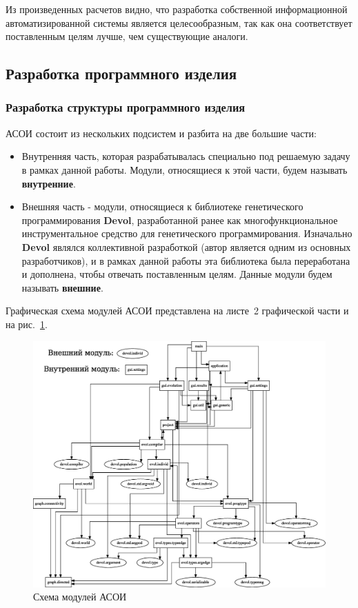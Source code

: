 \documentclass[russian,utf8,emptystyle]{eskdtext}
\begin{document}
\begin{spacing}{1.5}
Из произведенных расчетов видно, что разработка собственной информационной автоматизированной системы является целесообразным, так как она соответствует поставленным целям лучше, чем существующие аналоги.

\newpage
\subsection{Разработка программного изделия}
\subsubsection{Разработка структуры программного изделия}
АСОИ состоит из нескольких подсистем и разбита на две большие части:
\begin{itemize}
\item Внутренняя часть, которая разрабатывалась специально под решаемую задачу в рамках данной работы. Модули, относящиеся к этой части, будем называть \textbf{внутренние}. 
\item Внешняя часть - модули, относящиеся к библиотеке генетического программирования \textbf{Devol}, разработанной ранее как многофункциональное инструментальное средство для генетического программирования. Изначально \textbf{Devol} являлся коллективной разработкой (автор является одним из основных разработчиков), и в рамках данной работы эта библиотека была переработана и дополнена, чтобы отвечать поставленным целям. Данные модули будем называть \textbf{внешние}.
\end{itemize}

Графическая схема модулей АСОИ представлена на листе~2 графической части и на рис.~\ref{fig:modulesScheme}.

\begin{figure}[h!]
\centering
\includegraphics[width=1.0\textwidth]{modules}
\caption{Схема модулей АСОИ}
\label{fig:modulesScheme}
\end{figure}


\end{spacing}
\end{document}
